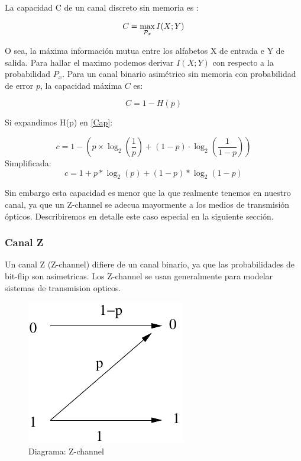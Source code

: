 \documentclass[12pt,twoside,openright]{moddalthesis}
\begin{document}
La capacidad C de un canal discreto sin memoria es :

\begin{equation}
C = \max_{{\cal{P}}_x} I(X;Y) 
\end{equation}

O sea, la máxima información mutua entre los alfabetos X de entrada e Y de salida.
Para hallar el maximo podemos derivar $I(X;Y)$ con respecto a la probabilidad $P_x$.
Para un canal binario asimétrico sin memoria con probabilidad de error $p$, la capacidad máxima $C$ es:

\begin{equation}\label{Cap}
C = 1 - H(p) 
\end{equation}

Si expandimos H(p) en \ref{Cap}:

$$ c = 1-\left(p \times \log_2\left(\frac{1}{p}\right) + (1-p) \cdot \log_2\left(\frac{1}{1-p}\right)\right) $$
Simplificada:
$$ c = 1 + p * \log_2(p) + (1 - p) * \log_2(1-p) $$

Sin embargo esta capacidad es menor que la que realmente tenemos en nuestro canal, ya que un Z-channel se adecua mayormente a los medios de transmisión ópticos. Describiremos en detalle este caso especial en la siguiente sección.

\subsubsection{Canal Z}
Un canal Z (Z-channel) difiere de un canal binario, ya que las probabilidades de bit-flip son asimetricas.
Los Z-channel se usan generalmente para modelar sistemas de transmision opticos.

\begin{figure}[th]
  \begin{center}
    \includegraphics[scale=0.5]{capacidad/zchannel}
  \end{center}
  \caption{Diagrama: Z-channel}
  \label{fig:Gal}
\end{figure}
\end{document}
